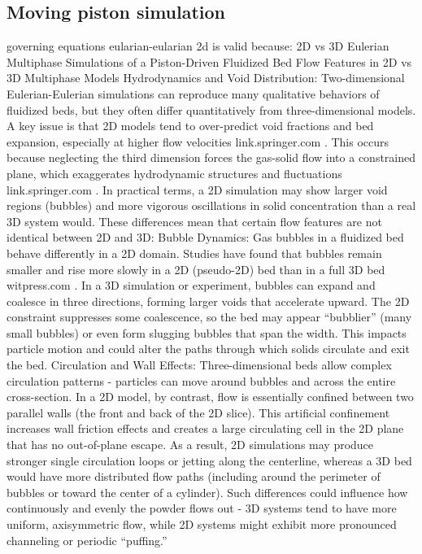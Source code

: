 \subsection{Moving piston simulation}
governing equations eularian-eularian
2d is valid because:
2D vs 3D Eulerian Multiphase Simulations of a Piston-Driven Fluidized Bed
Flow Features in 2D vs 3D Multiphase Models
Hydrodynamics and Void Distribution: Two-dimensional Eulerian-Eulerian simulations can reproduce many qualitative behaviors of fluidized beds, but they often differ quantitatively from three-dimensional models. A key issue is that 2D models tend to over-predict void fractions and bed expansion, especially at higher flow velocities
link.springer.com
. This occurs because neglecting the third dimension forces the gas-solid flow into a constrained plane, which exaggerates hydrodynamic structures and fluctuations
link.springer.com
. In practical terms, a 2D simulation may show larger void regions (bubbles) and more vigorous oscillations in solid concentration than a real 3D system would. These differences mean that certain flow features are not identical between 2D and 3D:
Bubble Dynamics: Gas bubbles in a fluidized bed behave differently in a 2D domain. Studies have found that bubbles remain smaller and rise more slowly in a 2D (pseudo-2D) bed than in a full 3D bed
witpress.com
. In a 3D simulation or experiment, bubbles can expand and coalesce in three directions, forming larger voids that accelerate upward. The 2D constraint suppresses some coalescence, so the bed may appear “bubblier” (many small bubbles) or even form slugging bubbles that span the width. This impacts particle motion and could alter the paths through which solids circulate and exit the bed.
Circulation and Wall Effects: Three-dimensional beds allow complex circulation patterns - particles can move around bubbles and across the entire cross-section. In a 2D model, by contrast, flow is essentially confined between two parallel walls (the front and back of the 2D slice). This artificial confinement increases wall friction effects and creates a large circulating cell in the 2D plane that has no out-of-plane escape. As a result, 2D simulations may produce stronger single circulation loops or jetting along the centerline, whereas a 3D bed would have more distributed flow paths (including around the perimeter of bubbles or toward the center of a cylinder). Such differences could influence how continuously and evenly the powder flows out - 3D systems tend to have more uniform, axisymmetric flow, while 2D systems might exhibit more pronounced channeling or periodic “puffing.”

